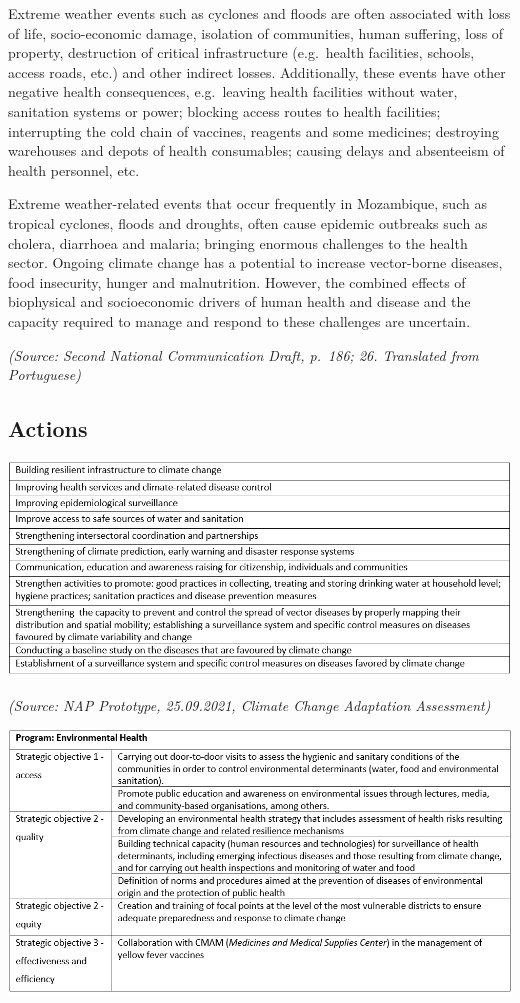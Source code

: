 \documentclass[
]{book}
\begin{document}
Extreme weather events such as cyclones and floods are often associated with loss of life, socio-economic damage, isolation of communities, human suffering, loss of property, destruction of critical infrastructure (e.g.~health facilities, schools, access roads, etc.) and other indirect losses. Additionally, these events have other negative health consequences, e.g.~leaving health facilities without water, sanitation systems or power; blocking access routes to health facilities; interrupting the cold chain of vaccines, reagents and some medicines; destroying warehouses and depots of health consumables; causing delays and absenteeism of health personnel, etc.

Extreme weather-related events that occur frequently in Mozambique, such as tropical cyclones, floods and droughts, often cause epidemic outbreaks such as cholera, diarrhoea and malaria; bringing enormous challenges to the health sector. Ongoing climate change has a potential to increase vector-borne diseases, food insecurity, hunger and malnutrition. However, the combined effects of biophysical and socioeconomic drivers of human health and disease and the capacity required to manage and respond to these challenges are uncertain.

\emph{(Source: Second National Communication Draft, p.~186; 26. Translated from Portuguese)}

\hypertarget{actions-4}{%
\subsection{Actions}\label{actions-4}}

\includegraphics{Figure38.png}

\emph{(Source: NAP Prototype, 25.09.2021, Climate Change Adaptation Assessment)}

\includegraphics{Figure39.png}
\end{document}
